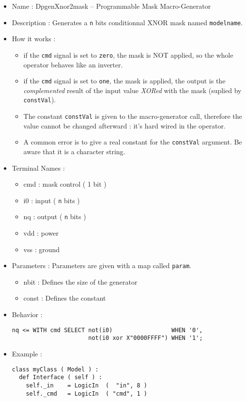 \begin{itemize}
    \item Name : DpgenXnor2mask -- Programmable Mask Macro-Generator
    \item Description : Generates a \verb-n- bits conditionnal XNOR mask named \verb-modelname-.
    \item How it works :
    \begin{itemize}
        \item if the \verb-cmd- signal is set to \verb-zero-, the mask is NOT applied, so the whole operator behaves like an inverter.
        \item if the \verb-cmd- signal is set to \verb-one-, the mask is applied, the output is the \emph{complemented} result of the input value \emph{XORed} with the mask (suplied by \verb-constVal-).
        \item The constant \verb-constVal- is given to the macro-generator call, therefore the value cannot be changed afterward : it's hard wired in the operator.
        \item A common error is to give a real constant for the \verb-constVal- argument. Be aware that it is a character string.
    \end{itemize}
    \item Terminal Names :
    \begin{itemize}
        \item cmd : mask control ( 1 bit )
        \item i0 : input ( \verb-n- bits )
        \item nq : output ( \verb-n- bits )
        \item vdd : power
        \item vss : ground
    \end{itemize}
    \item Parameters : Parameters are given with a map called \verb-param-.
    \begin{itemize}
        \item nbit : Defines the size of the generator
        \item const : Defines the constant
    \end{itemize}
    \item Behavior :
\begin{verbatim}
nq <= WITH cmd SELECT not(i0)                 WHEN '0',
                      not(i0 xor X"0000FFFF") WHEN '1';
\end{verbatim}
    \item Example :
\begin{verbatim}
class myClass ( Model ) :
  def Interface ( self ) :
    self._in    = LogicIn  (  "in", 8 )
    self._cmd   = LogicIn  ( "cmd", 1 )
    

\end{verbatim}
\end{itemize}
